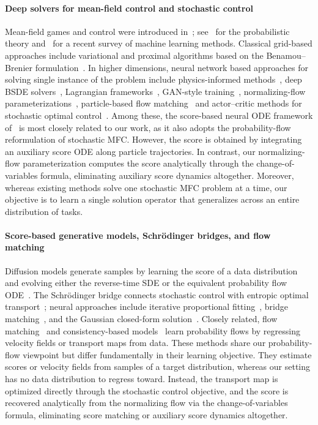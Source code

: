 \documentclass[preprint]{elsarticle}
\begin{document}
\paragraph{Deep solvers for mean-field control and stochastic control}
Mean-field games and control were introduced in~\cite{lasry2007mfg,huang2006large}; see~\cite{carmona2018probabilistic} for the probabilistic theory and~\cite{RuimengHu2024Recent} for a recent survey of machine learning methods. Classical grid-based approaches include variational and proximal algorithms based on the Benamou--Brenier formulation~\cite{Benamou2000ACF,Benamou2015,yu2024fast,Beck2008FISTA}. In higher dimensions, neural network based approaches for solving single instance of the problem include physics-informed methods~\cite{raissi2019pinn,sirignano2018dgm,weinan2018deepritz}, deep BSDE solvers~\cite{han2018solving}, Lagrangian frameworks~\cite{ruthotto2020machine}, GAN-style training~\cite{lin2021apacnet}, normalizing-flow parameterizations~\cite{huang2023bridging}, particle-based flow matching~\cite{yu2026high} and actor--critic methods for stochastic optimal control~\cite{zhou2021actor,zhou2024actor}.
Among these, the score-based neural ODE framework of~\cite{zhou2025score} is most closely related to our work, as it also adopts the probability-flow reformulation of stochastic MFC. However, the score is obtained by integrating an auxiliary score ODE along particle trajectories. In contrast, our normalizing-flow parameterization computes the score analytically through the change-of-variables formula, eliminating auxiliary score dynamics altogether. Moreover, whereas existing methods solve one stochastic MFC problem at a time, our objective is to learn a single solution operator that generalizes across an entire distribution of tasks.


\paragraph{Score-based generative models, Schr\"odinger bridges, and flow matching}
Diffusion models generate samples by learning the score of a data distribution and evolving either the reverse-time SDE or the equivalent probability flow ODE~\cite{anderson1982reverse,song2021score}. The Schr\"odinger bridge connects stochastic control with entropic optimal transport~\cite{chen2016relation,chen2021liaisons}; neural approaches include iterative proportional fitting~\cite{debortoli2021dsb}, bridge matching~\cite{shi2023dsbm}, and the Gaussian closed-form solution~\cite{bunne2023schrodinger}. Closely related, flow matching~\cite{lipman2023flow,chen2024flow} and consistency-based models~\cite{kim2023ctm,boffi2024flowmap} learn probability flows by regressing velocity fields or transport maps from data. These methods share our probability-flow viewpoint but differ fundamentally in their learning objective. They estimate scores or velocity fields from samples of a target distribution, whereas our setting has no data distribution to regress toward. Instead, the transport map is optimized directly through the stochastic control objective, and the score is recovered analytically from the normalizing flow via the change-of-variables formula, eliminating score matching or auxiliary score dynamics altogether.
\end{document}
